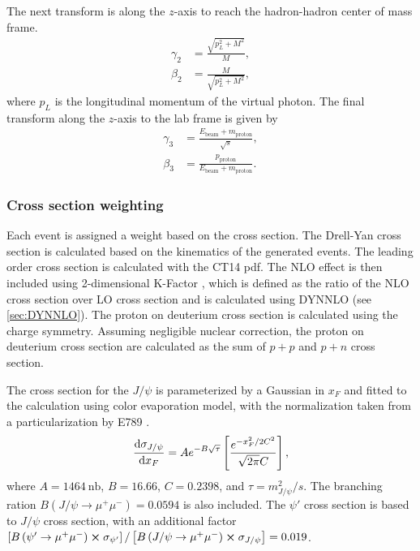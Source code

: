 \documentclass[../main.tex]{subfiles}
\begin{document}
The next transform is along the $z$-axis to reach the hadron-hadron center of mass frame.
\begin{equation}
	\begin{split}
		\gamma_2 &= \frac{\sqrt{p_L^2 + M^2}}{M},\\
		\beta_2 & = \frac{M}{\sqrt{p_L^2 + M^2}},
	\end{split}
\end{equation}
where $p_L$ is the longitudinal momentum of the virtual photon. The final transform along the
$z$-axis to the lab frame is given by
\begin{equation}
	\begin{split}
		\gamma_3 &= \frac{E_{\mathrm{beam}}+m_{\mathrm{proton}}}{\sqrt{s}},\\
		\beta_3 & = \frac{p_{\mathrm{proton}}}{E_{\mathrm{beam}}+m_{\mathrm{proton}}}.
	\end{split}
\end{equation}

\subsubsection{Cross section weighting}
Each event is assigned a weight based on the cross section. The Drell-Yan cross section is calculated based on
the kinematics of the generated events. The leading order cross section is calculated with the
CT14 pdf. The NLO effect is then included using 2-dimensional K-Factor \cite{shivangi-1747}, which
is defined as the ratio of the NLO cross section over LO cross section and is
calculated using DYNNLO (see \cref{sec:DYNNLO}).
The proton on deuterium cross section is calculated using the charge symmetry.
Assuming negligible nuclear correction, the proton on deuterium cross section are calculated
as the sum of $p+p$ and $p+n$ cross section.

The cross section for the $J/\psi$ is parameterized by a Gaussian in $x_F$ and fitted to the
calculation using color evaporation model, with the normalization taken from a particularization by E789 \cite{schub1995}.
\begin{equation}
	\dv{\sigma_{J/\psi}}{x_F} = Ae^{-B\sqrt{\tau}} \left[ \frac{e^{-x^2_F/2C^2}}{\sqrt{2\pi}C} \right],
\end{equation}
where $A=\SI{1464}{\nano\barn}$, $B=16.66$, $C=0.2398$, and $\tau=m^2_{J/\psi}/s$.
The branching ration $B\left(J/\psi\rightarrow \mu^+ \mu^-\right)=0.0594$ is also included.
The $\psi'$ cross section is based to $J/\psi$ cross section, with an additional factor
$\left[B\left(\psi'\rightarrow \mu^+ \mu^-\right)\cross\sigma_{\psi'}\right]/\left[B\left(J/\psi\rightarrow \mu^+ \mu^-\right)\cross\sigma_{J/\psi}\right]=0.019$.
\end{document}
